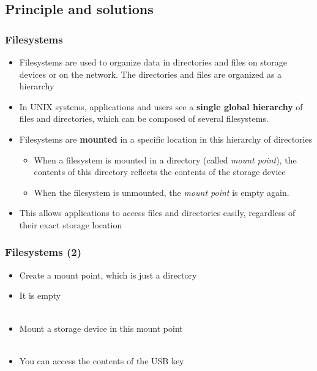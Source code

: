 \subsection{Principle and solutions}

\begin{frame}
  \frametitle{Filesystems}
  \begin{itemize}
  \item Filesystems are used to organize data in directories and files
    on storage devices or on the network. The directories and files
    are organized as a hierarchy
  \item In UNIX systems, applications and users see a {\bf single
      global hierarchy} of files and directories, which can be
    composed of several filesystems.
  \item Filesystems are {\bf mounted} in a specific location in this
    hierarchy of directories
    \begin{itemize}
    \item When a filesystem is mounted in a directory (called {\em
        mount point}), the contents of this directory reflects the
      contents of the storage device
    \item When the filesystem is unmounted, the {\em mount point} is
      empty again.
    \end{itemize}
  \item This allows applications to access files and directories easily,
    regardless of their exact storage location
  \end{itemize}
\end{frame}

\begin{frame}
  \frametitle{Filesystems (2)}
  \begin{itemize}
  \item Create a mount point, which is just a directory\\
  \item It is empty\\
    \\
    \code{$}
  \item Mount a storage device in this mount point\\
    \\
    \code{$}
  \item You can access the contents of the USB key\\
    \\
    \\
    \code{$}
  \end{itemize}
\end{frame}

